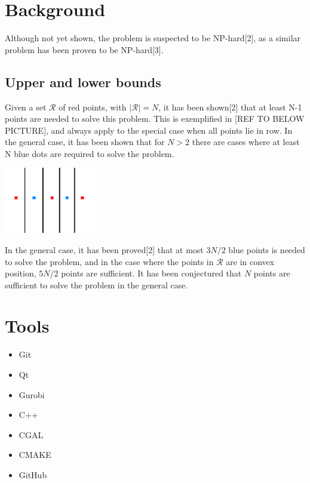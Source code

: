 \documentclass[a4paper,12pt]{article}
\begin{document}
\section{Background}
Although not yet shown, the problem is suspected to be NP-hard[2], as a similar problem has been proven to be NP-hard[3].
\subsection{Upper and lower bounds}
Given a set $\mathcal{R}$ of red points, with $|\mathcal{R}| = N$, it has been shown[2] that at least N-1 points are needed to solve this problem. This is exemplified in [REF TO BELOW PICTURE], and always apply to the special case when all points lie in row. In the general case, it has been shown that for $N>2$ there are cases where at least N blue dots are required to solve the problem.

\includegraphics[width=0.3\textwidth]{pictures/N-1solution.png}

In the general case, it has been proved[2] that at most $3N/2$ blue points is needed to solve the problem, and in the case where the points in  $\mathcal{R}$ are in convex position, $5N/2$ points are sufficient. It has been conjectured that $N$ points are sufficient to solve the problem in the general case.

\section{Tools}
\begin{itemize}
\item
Git
\item
Qt
\item
Gurobi
\item
C++
\item
CGAL
\item
CMAKE
\item
GitHub
\end{itemize}
\end{document}
